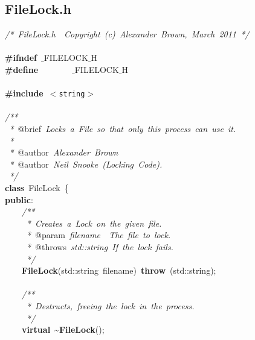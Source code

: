 \clearpage
\normalsize
\rmfamily
\subsection{FileLock.h}
\scriptsize
\sffamily
\noindent
\mbox{}\textit{/*\ FileLock.h\ \ Copyright\ (c)\ Alexander\ Brown,\ March\ 2011\ */} \\
\mbox{} \\
\mbox{}\textbf{\#ifndef}\ $\_$FILELOCK$\_$H \\
\mbox{}\textbf{\#define}\ \ \ \ \ \ \ \ $\_$FILELOCK$\_$H \\
\mbox{} \\
\mbox{}\textbf{\#include}\ \texttt{$<$string$>$} \\
\mbox{} \\
\mbox{}\textit{/**} \\
\mbox{}\textit{\ *\ }@brief\textit{\ Locks\ a\ File\ so\ that\ only\ this\ process\ can\ use\ it.} \\
\mbox{}\textit{\ *} \\
\mbox{}\textit{\ *\ }@author\textit{\ Alexander\ Brown} \\
\mbox{}\textit{\ *\ }@author\textit{\ Neil\ Snooke\ (Locking\ Code).} \\
\mbox{}\textit{\ */} \\
\mbox{}\textbf{class}\ FileLock\ \{ \\
\mbox{}\textbf{public}: \\
\mbox{}\ \ \ \ \textit{/**} \\
\mbox{}\textit{\ \ \ \ \ *\ Creates\ a\ Lock\ on\ the\ given\ file.} \\
\mbox{}\textit{\ \ \ \ \ *\ }@param\textit{\ filename\ \ The\ file\ to\ lock.} \\
\mbox{}\textit{\ \ \ \ \ *\ }@throws\textit{\ std::string\ If\ the\ lock\ fails.} \\
\mbox{}\textit{\ \ \ \ \ */} \\
\mbox{}\ \ \ \ \textbf{FileLock}(std::string\ filename)\ \textbf{throw}\ (std::string); \\
\mbox{} \\
\mbox{}\ \ \ \ \textit{/**} \\
\mbox{}\textit{\ \ \ \ \ *\ Destructs,\ freeing\ the\ lock\ in\ the\ process.} \\
\mbox{}\textit{\ \ \ \ \ */} \\
\mbox{}\ \ \ \ \textbf{virtual}\ \textasciitilde{}\textbf{FileLock}(); \\
